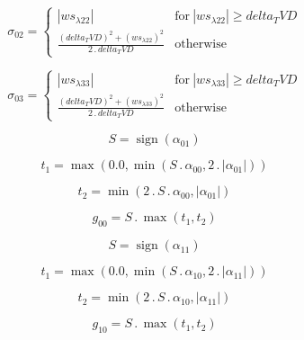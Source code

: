 \documentclass{article}
\begin{document}
\begin{dmath}\sigma_{0 2} = \begin{cases} \left|{ws_{\lambda 22}}\right| & \text{for}\: \left|{ws_{\lambda 22}}\right| \geq delta_TVD \\\frac{\left(delta_TVD \right)^{2} + \left(ws_{\lambda 22} \right)^{2}}{2 \,.\, delta_TVD} & \text{otherwise} 
\end{cases}\end{dmath}

\begin{dmath}\sigma_{0 3} = \begin{cases} \left|{ws_{\lambda 33}}\right| & \text{for}\: \left|{ws_{\lambda 33}}\right| \geq delta_TVD \\\frac{\left(delta_TVD \right)^{2} + \left(ws_{\lambda 33} \right)^{2}}{2 \,.\, delta_TVD} & \text{otherwise} 
\end{cases}\end{dmath}

\begin{dmath}S = \operatorname{sign}{\left (\alpha_{01} \right )}\end{dmath}

\begin{dmath}t_{1} = \max\left(0.0, \min\left(S \,.\, \alpha_{00}, 2 \,.\, \left|{\alpha_{01}}\right|\right)\right)\end{dmath}

\begin{dmath}t_{2} = \min\left(2 \,.\, S \,.\, \alpha_{00}, \left|{\alpha_{01}}\right|\right)\end{dmath}

\begin{dmath}g_{00} = S \,.\, \max\left(t_{1}, t_{2}\right)\end{dmath}

\begin{dmath}S = \operatorname{sign}{\left (\alpha_{11} \right )}\end{dmath}

\begin{dmath}t_{1} = \max\left(0.0, \min\left(S \,.\, \alpha_{10}, 2 \,.\, \left|{\alpha_{11}}\right|\right)\right)\end{dmath}

\begin{dmath}t_{2} = \min\left(2 \,.\, S \,.\, \alpha_{10}, \left|{\alpha_{11}}\right|\right)\end{dmath}

\begin{dmath}g_{10} = S \,.\, \max\left(t_{1}, t_{2}\right)\end{dmath}
\end{document}
